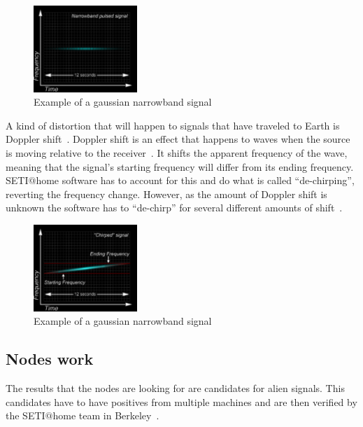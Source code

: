 \begin{figure}[!htb]
        \centering
        \includegraphics[width=0.35\textwidth]{figures/narrow_pulsed.pdf}
        \caption{Example of a gaussian narrowband
        signal~\cite{hid-sp18-601-www-sathome-howworks}}\label{narrowbandfigure}
\end{figure}

 A kind of distortion that will happen to signals that have traveled to Earth
 is Doppler shift~\cite{hid-sp18-601-www-doppler-light}. Doppler shift is an 
 effect that happens to waves when the 
 source is moving relative to the receiver~\cite{hid-sp18-601-www-doppler}. 
 It shifts the apparent frequency 
 of the wave, meaning that the signal's starting frequency will differ from its 
 ending frequency. SETI$@$home software has to account for this and do what 
 is called ``de-chirping'', reverting the frequency change. However, as the 
 amount of Doppler shift is unknown  the software has to ``de-chirp'' for
 several  different amounts of shift~\cite{hid-sp18-601-www-sathome-howworks}.

\begin{figure}[!htb]
        \centering
        \includegraphics[width=0.35\textwidth]{figures/narrow_chirped.pdf}
        \caption{Example of a gaussian narrowband
        signal~\cite{hid-sp18-601-www-sathome-howworks}}\label{dopplerfigure}
\end{figure}

\subsection{Nodes work}\label{hid-sp18-601-subsection-nodes-work}
The results that the nodes are looking for are candidates for alien signals.
This candidates have to have positives from multiple machines and are then 
verified by the SETI$@$home team in 
Berkeley~\cite{hid-sp18-601-www-sathome-howworks}.

